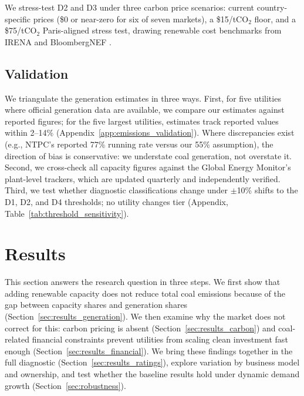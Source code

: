 \documentclass[review,3p,authoryear]{elsarticle}
\begin{document}
We stress-test D2 and D3 under three carbon price scenarios: current country-specific prices (\$0 or near-zero for six of seven markets), a \$15/tCO$_2$ floor, and a \$75/tCO$_2$ Paris-aligned stress test, drawing renewable cost benchmarks from IRENA and BloombergNEF \citep{IRENA2024,BNEF2024}.

\subsection{Validation}

We triangulate the generation estimates in three ways. First, for five utilities where official generation data are available, we compare our estimates against reported figures; for the five largest utilities, estimates track reported values within 2--14\% (Appendix~\ref{app:emissions_validation}). Where discrepancies exist (e.g., NTPC's reported 77\% running rate versus our 55\% assumption), the direction of bias is conservative: we understate coal generation, not overstate it. Second, we cross-check all capacity figures against the Global Energy Monitor's plant-level trackers, which are updated quarterly and independently verified. Third, we test whether diagnostic classifications change under $\pm$10\% shifts to the D1, D2, and D4 thresholds; no utility changes tier (Appendix, Table~\ref{tab:threshold_sensitivity}).


\section{Results}
\label{sec:results}

This section answers the research question in three steps. We first show that adding renewable capacity does not reduce total coal emissions because of the gap between capacity shares and generation shares (Section~\ref{sec:results_generation}). We then examine why the market does not correct for this: carbon pricing is absent (Section~\ref{sec:results_carbon}) and coal-related financial constraints prevent utilities from scaling clean investment fast enough (Section~\ref{sec:results_financial}). We bring these findings together in the full diagnostic (Section~\ref{sec:results_ratings}), explore variation by business model and ownership, and test whether the baseline results hold under dynamic demand growth (Section~\ref{sec:robustness}).
\end{document}
